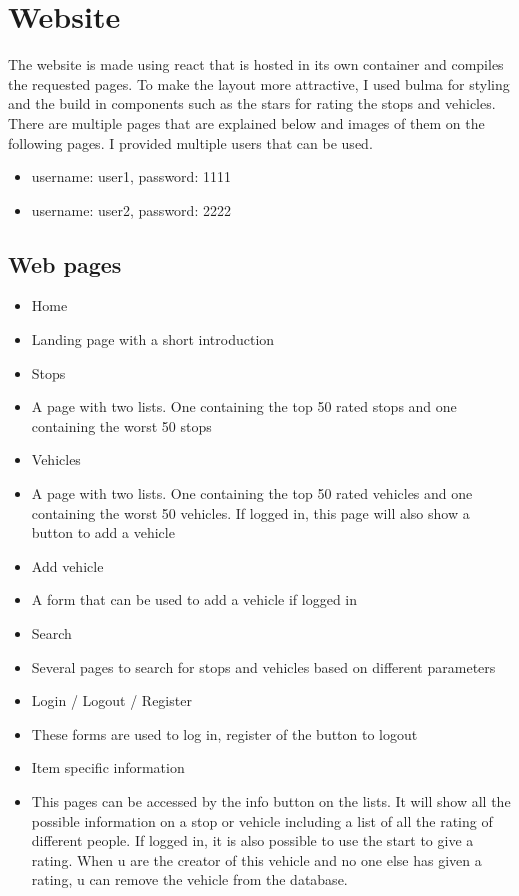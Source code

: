 \documentclass[12pt,a4paper]{article}
\begin{document}
\pagebreak
\section{Website}
The website is made using react that is hosted in its own container and compiles the requested pages. To make the layout more attractive, I used bulma for styling and the build in components such as the stars for rating the stops and vehicles.\\
There are multiple pages that are explained below and images of them on the following pages. I provided multiple users that can be used.

\begin{itemize}
\item username: user1, password: 1111
\item username: user2, password: 2222
\end{itemize}


\subsection{Web pages}
\begin{itemize}
\item Home
\item[] Landing page with a short introduction
\item Stops
\item[] A page with two lists. One containing the top 50 rated stops and one containing the worst 50 stops
\item Vehicles
\item[] A page with two lists. One containing the top 50 rated vehicles and one containing the worst 50 vehicles. If logged in, this page will also show a button to add a vehicle
\item Add vehicle
\item[] A form that can be used to add a vehicle if logged in
\item Search
\item[] Several pages to search for stops and vehicles based on different parameters
\item Login / Logout / Register
\item[] These forms are used to log in, register of the button to logout
\pagebreak
\item Item specific information
\item [] This pages can be accessed by the info button on the lists. It will show all the possible information on a stop or vehicle including a list of all the rating of different people. If logged in, it is also possible to use the start to give a rating. When u are the creator of this vehicle and no one else has given a rating, u can remove the vehicle from the database.
\end{itemize}
\pagebreak
\end{document}

